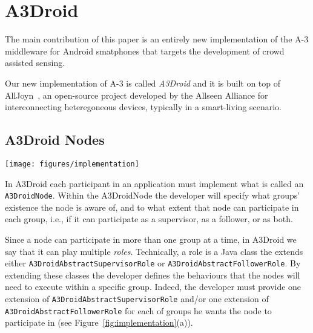 \section{A3Droid}
\label{sec:a3droid}

The main contribution of this paper is an entirely new implementation of the A-3 middleware for Android smatphones that targets the development of crowd assisted sensing. 

Our new implementation of A-3 is called \emph{A3Droid} and it is built on top of AllJoyn~\cite{AllJoyn}, an open-source project developed by the Allseen Alliance for interconnecting heteregoneous devices, typically in a smart-living scenario.  

\subsection{A3Droid Nodes}
\label{subg:a3droidNodes}

\begin{figure*}[t!]
\centering
\texttt{[image: figures/implementation]}
\caption{(a) A3Droid Implementation. (b) A3DroidNode roles.}
\label{fig:implementation}
\end{figure*}

In A3Droid each participant in an application must implement what is called an \texttt{A3DroidNode}. Within the A3DroidNode the developer will specify what groups' existence the node is aware of, and to what extent that node can participate in each group, i.e., if it can participate as a supervisor, as a follower, or as both. 

Since a node can participate in more than one group at a time, in A3Droid we say that it can play multiple \emph{roles}. Technically, a role is a Java class the extends either \texttt{A3DroidAbstractSupervisorRole} or \texttt{A3DroidAbstractFollowerRole}. By extending these classes the developer defines the behaviours that the nodes will need to execute within a specific group. Indeed, the developer must provide one extension of \texttt{A3DroidAbstractSupervisorRole} and/or one extension of \texttt{A3DroidAbstractFollowerRole} for each of groups he wants the node to participate in (see Figure~\ref{fig:implementation}(a)). 

